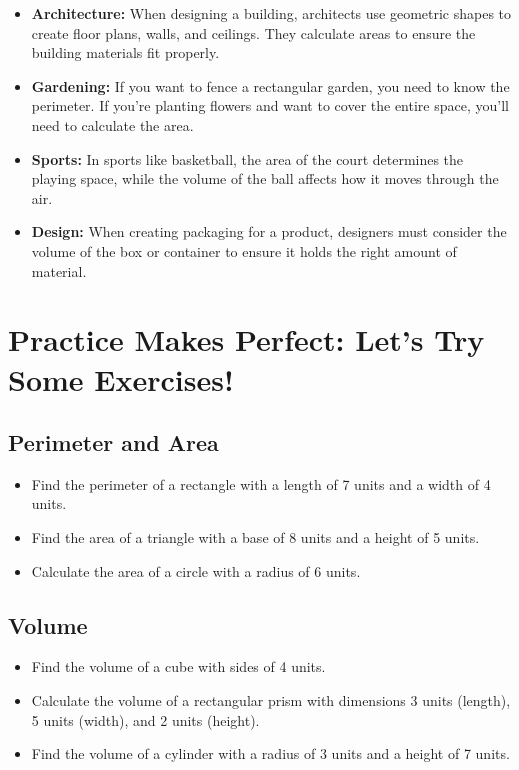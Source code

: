 \begin{itemize}
    \item \textbf{Architecture:} When designing a building, architects use geometric shapes to create floor plans, walls, and ceilings. They calculate areas to ensure the building materials fit properly.
    \item \textbf{Gardening:} If you want to fence a rectangular garden, you need to know the perimeter. If you’re planting flowers and want to cover the entire space, you’ll need to calculate the area.
    \item \textbf{Sports:} In sports like basketball, the area of the court determines the playing space, while the volume of the ball affects how it moves through the air.
    \item \textbf{Design:} When creating packaging for a product, designers must consider the volume of the box or container to ensure it holds the right amount of material.
\end{itemize}

\section{Practice Makes Perfect: Let’s Try Some Exercises!}
\subsection{Perimeter and Area}
\begin{itemize}
    \item Find the perimeter of a rectangle with a length of 7 units and a width of 4 units.
    \item Find the area of a triangle with a base of 8 units and a height of 5 units.
    \item Calculate the area of a circle with a radius of 6 units.
\end{itemize}

\subsection{Volume}
\begin{itemize}
    \item Find the volume of a cube with sides of 4 units.
    \item Calculate the volume of a rectangular prism with dimensions 3 units (length), 5 units (width), and 2 units (height).
    \item Find the volume of a cylinder with a radius of 3 units and a height of 7 units.
\end{itemize}

